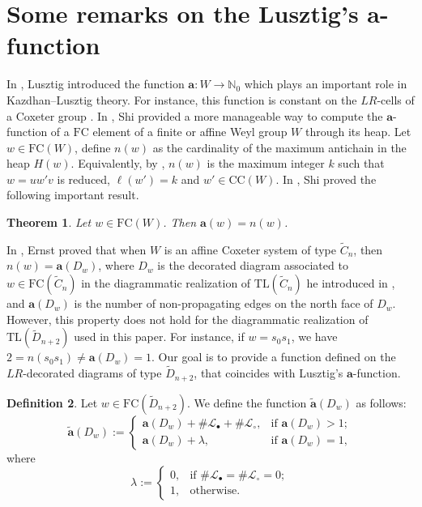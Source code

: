 \documentclass{amsart}
\newcommand{\D}{{\widetilde{D}_{n+2}}}
\newcommand{\tl}{{\mathrm{TL}}}
\newcommand{\fc}{{\mathrm{FC}}}
\newcommand{\bO}{{\mathcal{L}_{\bullet}}}
\newcommand{\wO}{{\mathcal{L}_{\circ}}}
\newcommand{\TTC}{\mathrm{CC}}
\newcommand{\ab}{\mathbf{a}}
\newcommand{\at}{\widetilde{\mathbf{a}}}
\newtheorem{Theorem}{Theorem}[section]
\theoremstyle{definition}
\newtheorem{Definition}[Theorem]{Definition}
\begin{document}
\section{Some remarks on the Lusztig's $\ab$-function}\label{sec:afunc}
In \cite{lusztig_cells}, Lusztig introduced the function $\ab:W\rightarrow\mathbb{N}_0$ which plays an important role in Kazdhan--Lusztig theory. For instance, this function is constant on the $LR$-cells of a Coxeter group \cite[Theorem 5.4]{lusztig_cells}. In \cite{shi_fully}, Shi provided a more manageable way to compute the $\ab$-function of a $\fc$ element of a finite or affine Weyl group $W$ through its heap. Let $w\in \fc(W)$, define $n(w)$ as the cardinality of the maximum antichain in the heap $H(w)$. Equivalently, by \cite[Lemma 2.7]{shi_fully}, $n(w)$ is the maximum integer $k$ such that $w=uw'v$ is reduced, $\ell(w')=k$ and $w'\in\TTC(W)$.
In \cite[Theorem 3.1]{shi_fully}, Shi proved the following important result.
\begin{Theorem}
    Let $w\in \fc(W)$. Then $\ab(w)=n(w)$.
\end{Theorem}

In \cite[Lemma 5.4, 5.5]{ErnstDiagramII}, Ernst proved that when $W$ is an affine Coxeter system of type $\widetilde{C}_n$, then $n(w)=\ab(D_w)$, where $D_w$ is the decorated diagram associated to $w\in \fc(\widetilde{C}_n)$ in the diagrammatic realization of $\tl(\widetilde{C}_n)$ he introduced in \cite{ErnstDiagramI,ErnstDiagramII}, and $\ab(D_w)$ is the number of non-propagating edges on the north face of $D_w$. However, this property does not hold for the diagrammatic realization of $\tl(\D)$ used in this paper. For instance, if $w=s_0s_1$, we have $2=n(s_0s_1)\neq \ab(D_w)=1$. Our goal is to provide a function defined on the $LR$-decorated diagrams of type $\D$, that coincides with Lusztig's $\ab$-function.

\begin{Definition}

Let $w \in \fc(\D)$. We define the function $\at(D_w)$ as follows:
$$
\at(D_w) :=
\begin{cases}
\ab(D_w) + \#\bO + \#\wO, & \text{if } \ab(D_w) > 1; \\
\ab(D_w) + \lambda, & \text{if } \ab(D_w) = 1,
\end{cases}
$$
where
$$
\lambda :=
\begin{cases}
0, & \text{if } \#\bO = \#\wO = 0; \\
1, & \text{otherwise}.
\end{cases}
$$

\end{Definition}
\end{document}
